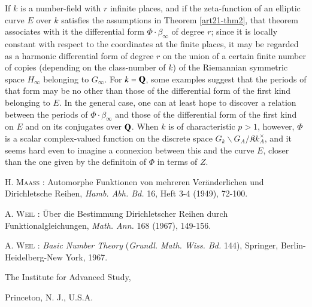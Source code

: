 If $k$ is a number-field with $r$ infinite places, and if the zeta-function of an elliptic curve $E$ over $k$ satisfies the assumptions in Theorem \ref{art21-thm2}, that theorem associates with it the differential form $\Phi\cdot \beta_{\infty}$ of degree $r$; since it is locally constant with respect to the coordinates at the finite places, it may be regarded as a harmonic differential form of degree $r$ on the union of a certain finite number of copies (depending on the class-number of $k$) of the Riemannian symmetric space $H_{\infty}$ belonging to $G_{\infty}$. For $k=\mathbf{Q}$, some examples suggest that the periods of that form may be no other than those of the differential form of the first kind belonging to $E$. In the general case, one can at least hope to discover a relation between the periods of $\Phi\cdot \beta_{\infty}$ and those of the differential form of the first kind on $E$ and on its conjugates over $\mathbf{Q}$. When $k$ is of characteristic $p>1$, however, $\Phi$ is a scalar complex-valued function on the discrete space $G_{k}\backslash G_{A}/\mathfrak{K}k^{\times}_{A}$, and it seems hard even to imagine a connexion between this and the curve $E$, closer than the one given by the definitoin of $\Phi$ in terms of $Z$.

\newpage

\begin{thebibliography}{99}
 \textsc{H. Maass :} Automorphe Funktionen von mehreren Ver\"anderlichen und Dirichletsche Reihen, {\em Hamb. Abh. Bd.} 16, Heft 3-4 (1949), 72-100.

 \textsc{A. Weil :} \"Uber die Bestimmung Dirichletscher Reihen durch Funktionalgleichungen, {\em Math. Ann.} 168 (1967), 149-156.

 \textsc{A. Weil :} {\em Basic Number Theory} ({\em Grundl. Math. Wiss. Bd.} 144), Springer, Berlin-Heidelberg-New York, 1967.

\end{thebibliography}

\bigskip

\noindent
{\small The Institute for Advanced Study,}

\noindent
{\small Princeton, N. J., U.S.A.}


